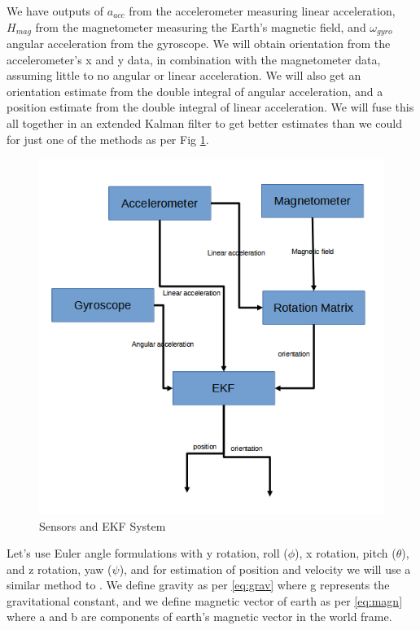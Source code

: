 \documentclass[conference]{IEEEtran}
\begin{document}
We have outputs of $a_{acc}$ from the accelerometer measuring linear acceleration, $H_{mag}$ from the magnetometer measuring the Earth's magnetic field, and $\omega_{gyro}$ angular acceleration from the gyroscope. We will obtain orientation from the accelerometer's x and y data, in combination with the magnetometer data, assuming little to no angular or linear acceleration. We will also get an orientation estimate from the double integral of angular acceleration, and a position estimate from the double integral of linear acceleration. We will fuse this all together in an extended Kalman filter to get better estimates than we could for just one of the methods as per Fig \ref{fig:ekf}.

\begin{figure}[h!]
  \includegraphics[width=\columnwidth]{fig_2_ekf.png}
  \caption{Sensors and EKF System}
  \label{fig:ekf}
\end{figure}


Let's use Euler angle formulations with y rotation, roll ($\phi$), x rotation, pitch ($\theta$), and z rotation, yaw ($\psi$), and for estimation of position and velocity we will use a similar method to \cite{b18}. We define gravity as per \eqref{eq:grav} where g represents the gravitational constant, and we define magnetic vector of earth as per \eqref{eq:magn} where a and b are components of earth's magnetic vector in the world frame.
\end{document}

